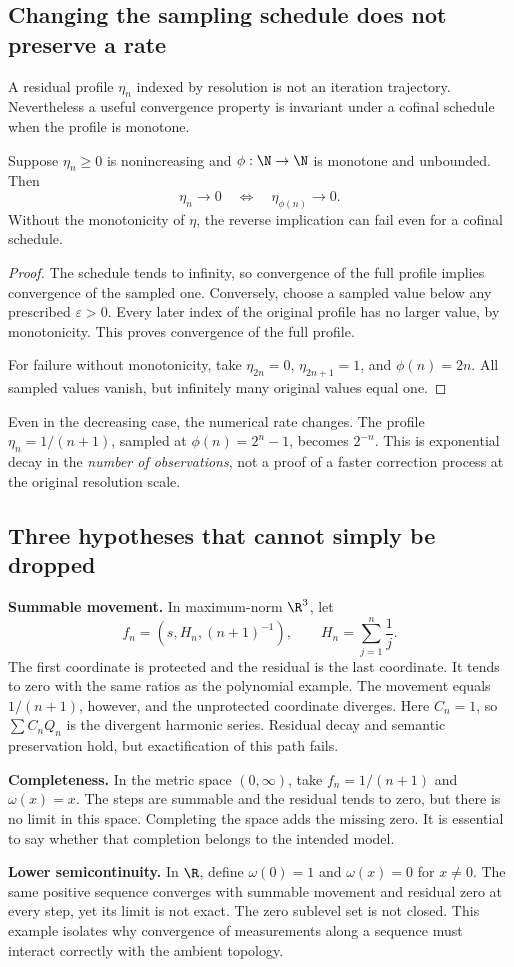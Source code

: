 \subsection{Changing the sampling schedule does not preserve a rate}
A residual profile \(\eta_n\) indexed by resolution is not an iteration trajectory. Nevertheless a useful convergence property is invariant under a cofinal schedule when the profile is monotone.

\begin{proposition}\label{KS75}
Suppose \(\eta_n\ge0\) is nonincreasing and \(\phi:\N\to\N\) is monotone and unbounded. Then
\[
 \eta_n\to0\quad\Longleftrightarrow\quad\eta_{\phi(n)}\to0.
\]
Without the monotonicity of \(\eta\), the reverse implication can fail even for a cofinal schedule.
\end{proposition}
\begin{proof}
The schedule tends to infinity, so convergence of the full profile implies convergence of the sampled one. Conversely, choose a sampled value below any prescribed \(\varepsilon>0\). Every later index of the original profile has no larger value, by monotonicity. This proves convergence of the full profile.

For failure without monotonicity, take \(\eta_{2n}=0\), \(\eta_{2n+1}=1\), and \(\phi(n)=2n\). All sampled values vanish, but infinitely many original values equal one.
\end{proof}
Even in the decreasing case, the numerical rate changes. The profile \(\eta_n=1/(n+1)\), sampled at \(\phi(n)=2^n-1\), becomes \(2^{-n}\). This is exponential decay in the \emph{number of observations}, not a proof of a faster correction process at the original resolution scale.

\subsection{Three hypotheses that cannot simply be dropped}
\textbf{Summable movement.} In maximum-norm \(\R^3\), let
\[
 f_n=(s,H_n,(n+1)^{-1}),\qquad
 H_n=\sum_{j=1}^{n}\frac1j.
\]
The first coordinate is protected and the residual is the last coordinate. It tends to zero with the same ratios as the polynomial example. The movement equals \(1/(n+1)\), however, and the unprotected coordinate diverges. Here \(C_n=1\), so \(\sum C_nQ_n\) is the divergent harmonic series. Residual decay and semantic preservation hold, but exactification of this path fails.

\textbf{Completeness.} In the metric space \((0,\infty)\), take \(f_n=1/(n+1)\) and \(\omega(x)=x\). The steps are summable and the residual tends to zero, but there is no limit in this space. Completing the space adds the missing zero. It is essential to say whether that completion belongs to the intended model.

\textbf{Lower semicontinuity.} In \(\R\), define \(\omega(0)=1\) and \(\omega(x)=0\) for \(x\ne0\). The same positive sequence converges with summable movement and residual zero at every step, yet its limit is not exact. The zero sublevel set is not closed. This example isolates why convergence of measurements along a sequence must interact correctly with the ambient topology.
